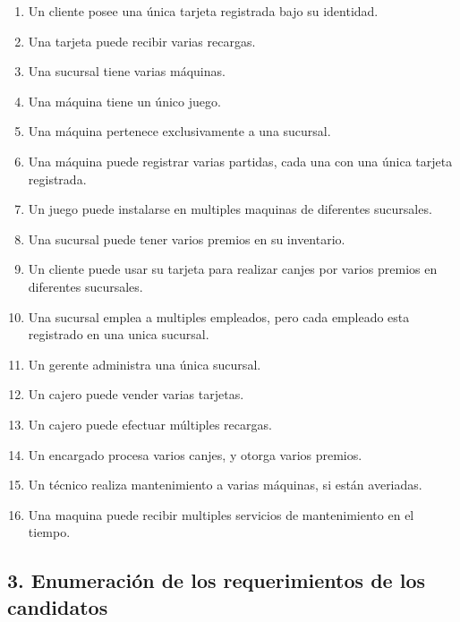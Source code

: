 \begin{enumerate}
    \item Un cliente posee una única tarjeta registrada bajo su identidad.
    \item Una tarjeta puede recibir varias recargas.
    \item Una sucursal tiene varias máquinas.
    \item Una máquina tiene un único juego.
    \item Una máquina pertenece exclusivamente a una sucursal.
    \item Una máquina puede registrar varias partidas, cada una con una única tarjeta registrada.
    \item Un juego puede instalarse en multiples maquinas de diferentes sucursales.
    \item Una sucursal puede tener varios premios en su inventario.
    \item Un cliente puede usar su tarjeta para realizar canjes por varios premios en diferentes sucursales.
    \item Una sucursal emplea a multiples empleados, pero cada empleado esta registrado en una unica sucursal.
    \item Un gerente administra una única sucursal.
    \item Un cajero puede vender varias tarjetas.
    \item Un cajero puede efectuar múltiples recargas.
    \item Un encargado procesa varios canjes, y otorga varios premios.
    \item Un técnico realiza mantenimiento a varias máquinas, si están averiadas.
    \item Una maquina puede recibir multiples servicios de mantenimiento en el tiempo.
\end{enumerate}

\subsection*{3. Enumeración de los requerimientos de los candidatos}

